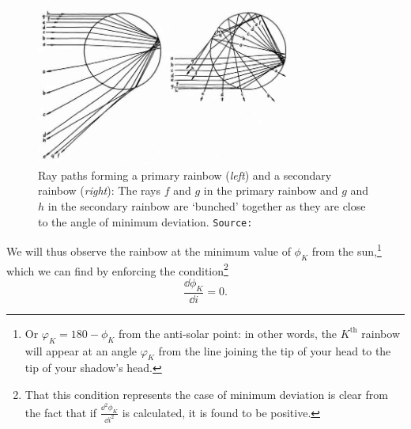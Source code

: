 \begin{refsection}


\begin{figure}[!htb]
    \centering
    \includegraphics[width=0.75\textwidth]{figs/rainbowDeviation.jpeg}
    \caption{Ray paths forming a primary rainbow (\textit{left}) and a secondary rainbow (\textit{right}): The rays $f$ and $g$ in the primary rainbow and $g$ and $h$ in the secondary rainbow are `bunched' together as they are close to the angle of minimum deviation. \texttt{Source:~\cite{walker_multiple_1976}}}
    \label{fig:rainbowDeviation}
\end{figure}



We will thus observe the rainbow at the minimum value of $\phi_K$ from the sun,\footnote{Or $\varphi_K = 180 - \phi_K$ from the anti-solar point: in other words, the $K^\text{th}$ rainbow will appear at an angle $\varphi_K$ from the line joining the tip of your head to the tip of your shadow's head.} which we can find by enforcing the condition\footnote{That this condition represents the case of minimum deviation is clear from the fact that if $\frac{\dd^2 \phi_K}{\dd i^2}$ is calculated, it is found to be positive.}  $$\frac{\dd\phi_K}{\dd i}=0.$$


\end{refsection}
